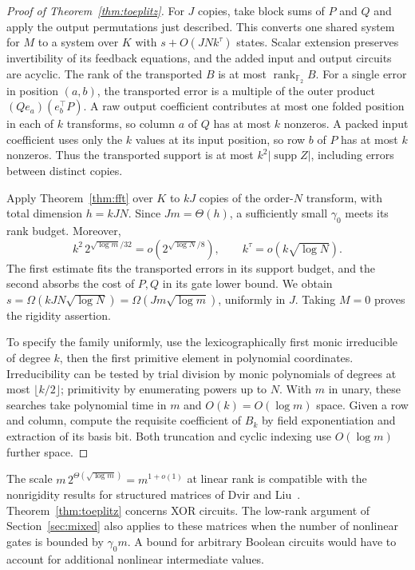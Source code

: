 \documentclass[11pt]{article}
\theoremstyle{definition}
\theoremstyle{remark}
\newcommand{\F}{\mathbb{F}}
\newcommand{\supp}{\operatorname{supp}}
\newcommand{\rk}{\operatorname{rank}}
\begin{document}
\begin{proof}[Proof of Theorem~\ref{thm:toeplitz}]
For $J$ copies, take block sums of $P$ and $Q$ and apply the output
permutations just described. This converts one shared system for
$M$ to a system over $K$ with $s+O(JNk^\tau)$ states. Scalar extension
preserves invertibility of its feedback equations, and the added
input and output circuits are acyclic. The rank of the transported
$B$ is at most $\rk_{\F_2}B$. For a single error in position $(a,b)$,
the transported error is a multiple of the outer product
$(Qe_a)(e_b^\top P)$. A raw output coefficient contributes at most
one folded position in each of $k$ transforms, so column $a$ of $Q$
has at most $k$ nonzeros. A packed input coefficient uses only the
$k$ values at its input position, so row $b$ of $P$ has at most $k$
nonzeros. Thus the transported support is at most $k^2|\supp Z|$,
including errors between distinct copies.

Apply Theorem~\ref{thm:fft} over $K$ to $kJ$ copies of the order-$N$
transform, with total dimension $h=kJN$. Since $Jm=\Theta(h)$, a
sufficiently small $\gamma_0$ meets its rank budget. Moreover,
\[
    k^2\,2^{\sqrt{\log m}/32}=o(2^{\sqrt{\log N}/8}),
    \qquad k^\tau=o(k\sqrt{\log N}).
\]
The first estimate fits the transported errors in its support budget,
and the second absorbs the cost of $P,Q$ in its gate lower bound.
We obtain $s=\Omega(kJN\sqrt{\log N})=\Omega(Jm\sqrt{\log m})$,
uniformly in $J$. Taking $M=0$ proves the rigidity assertion.

To specify the family uniformly, use the lexicographically first monic
irreducible of degree $k$, then the first primitive element in polynomial
coordinates. Irreducibility can be tested by trial division by monic
polynomials of degrees at most $\lfloor k/2\rfloor$; primitivity by
enumerating powers up to $N$. With $m$ in unary, these searches take
polynomial time in $m$ and $O(k)=O(\log m)$ space. Given a row and column,
compute the requisite coefficient of $B_k$ by field exponentiation
and extraction of its basis bit. Both truncation and cyclic indexing
use $O(\log m)$ further space.
\end{proof}
The scale $m\,2^{\Theta(\sqrt{\log m})}=m^{1+o(1)}$ at linear rank
is compatible with the nonrigidity results for structured matrices
of Dvir and Liu~\cite{DL}. Theorem~\ref{thm:toeplitz} concerns XOR
circuits. The low-rank argument of Section~\ref{sec:mixed} also applies
to these matrices when the number of nonlinear gates is bounded by
$\gamma_0m$. A bound for arbitrary Boolean circuits would have to
account for additional nonlinear intermediate values.
\end{document}
